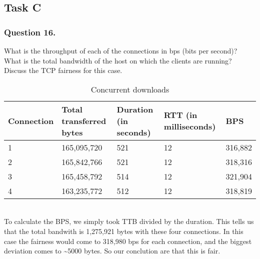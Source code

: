 \documentclass{mall}
\begin{document}
\subsection{Task C}
\subsubsection{Question 16.}
What is the throughput of each of the connections in bps (bits per second)? What is the total bandwidth of the host on which the clients are running? Discuss the TCP fairness for this case.\\
\begin{table}[ht]
\centering
\begin{tabular}{lllll}
 
Connection & Total transferred bytes & Duration (in seconds) & RTT (in milliseconds) & BPS\\\hline
1 & 165,095,720 & 521 & 12 & 316,882  \\\hline
2 & 165,842,766 & 521 & 12 & 318,316 \\\hline
3 & 165,458,792 & 514 & 12 & 321,904\\ \hline
4 & 163,235,772 & 512 & 12 & 318,819\\ \hline
\end{tabular}
\caption{Concurrent downloads}
\end{table}\\
To calculate the BPS, we simply took TTB divided by the duration. This tells us that the total bandwith is 1,275,921 bytes with these four connections. In this case the fairness would come to 318,980 bps for each connection, and the biggest deviation comes to \textasciitilde  5000 bytes. So our conclution are that this is fair.
\end{document}
